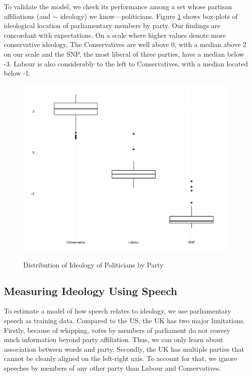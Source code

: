 \documentclass[12pt, letterpaper]{article}
\begin{document}
To validate the model, we check its performance among a set whose partisan affiliations (and $\sim$ ideology) we know---politicians. Figure \ref{fig:fig1} shows box-plots of ideological location of parliamentary members by party. Our findings are concordant with expectations. On a scale where higher values denote more conservative ideology, The Conservatives are well above 0, with a median above 2 on our scale and the SNP, the most liberal of three parties, have a median below -3. Labour is also considerably to the left to Conservatives, with a median located below -1.

\begin{figure}[!htbp]
\centering
\caption{Distribution of Ideology of Politicians by Party}
\includegraphics[scale=.75]{../figs/parl_box.pdf}
\label{fig:fig1}
\end{figure}

\subsection*{Measuring Ideology Using Speech}

To estimate a model of how speech relates to ideology, we use parliamentary speech as training data. Compared to the US, the UK has two major limitations. Firstly, because of whipping, votes by members of parliament do not convey much information beyond party affiliation. Thus, we can only learn about association between words and party. Secondly, the UK has multiple parties that cannot be cleanly aligned on the left-right axis. To account for that, we ignore speeches by members of any other party than Labour and Conservatives.
\end{document}

